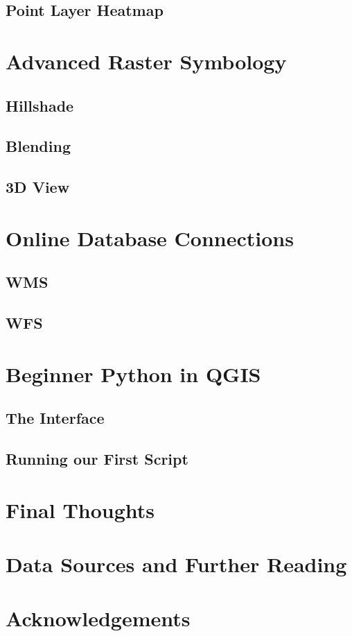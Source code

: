 \documentclass{article}
\begin{document}
\subsection {Point Layer Heatmap}

\section{Advanced Raster Symbology}

\subsection{Hillshade}

\subsection{Blending}

\subsection{3D View}

\section{Online Database Connections}

\subsection{WMS}

\subsection{WFS}

\section{Beginner Python in QGIS}

\subsection{The Interface}

\subsection{Running our First Script}

\section{Final Thoughts}

\section{Data Sources and Further Reading}

\section{Acknowledgements}

\newpage
\printbibliography
\end{document}
